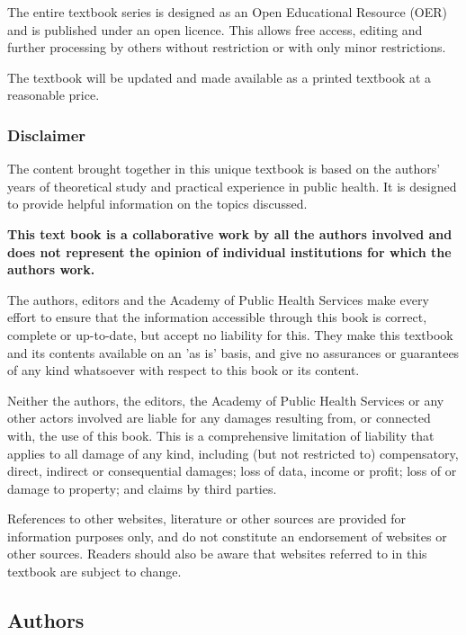 \documentclass{article}
\begin{document}
The entire textbook series is designed as an Open Educational Resource (OER) and is published under an open licence. This allows free access, editing and further processing by others without restriction or with only minor restrictions.


The textbook will be updated and made available as a printed textbook at a reasonable price.


\subsubsection{Disclaimer}\label{H8101608}



The content brought together in this unique textbook is based on the authors' years of theoretical study and practical experience in public health. It is designed to provide helpful information on the topics discussed.


\textbf{This text book is a collaborative work by all the authors involved and does not represent the opinion of individual institutions for which the authors work.}


The authors, editors and the Academy of Public Health Services make every effort to ensure that the information accessible through this book is correct, complete or up-to-date, but accept no liability for this. They make this textbook and its contents available on an 'as is' basis, and give no assurances or guarantees of any kind whatsoever with respect to this book or its content.


Neither the authors, the editors, the Academy of Public Health Services or any other actors involved are liable for any damages resulting from, or connected with, the use of this book. This is a comprehensive limitation of liability that applies to all damage of any kind, including (but not restricted to) compensatory, direct, indirect or consequential damages; loss of data, income or profit; loss of or damage to property; and claims by third parties.


References to other websites, literature or other sources are provided for information purposes only, and do not constitute an endorsement of websites or other sources. Readers should also be aware that websites referred to in this textbook are subject to change.




\subsection{Authors}\label{H7919849}
\end{document}
